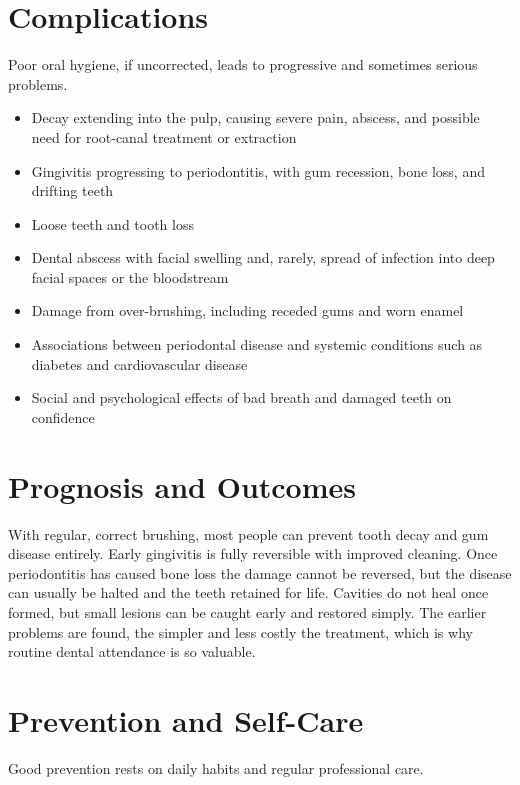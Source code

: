 \section*{Complications}
Poor oral hygiene, if uncorrected, leads to progressive and sometimes serious problems.

\begin{itemize}
    \item Decay extending into the pulp, causing severe pain, abscess, and possible need for root-canal treatment or extraction
    \item Gingivitis progressing to periodontitis, with gum recession, bone loss, and drifting teeth
    \item Loose teeth and tooth loss
    \item Dental abscess with facial swelling and, rarely, spread of infection into deep facial spaces or the bloodstream
    \item Damage from over-brushing, including receded gums and worn enamel
    \item Associations between periodontal disease and systemic conditions such as diabetes and cardiovascular disease
    \item Social and psychological effects of bad breath and damaged teeth on confidence
\end{itemize}

\section*{Prognosis and Outcomes}
With regular, correct brushing, most people can prevent tooth decay and gum disease entirely. Early gingivitis is fully reversible with improved cleaning. Once periodontitis has caused bone loss the damage cannot be reversed, but the disease can usually be halted and the teeth retained for life. Cavities do not heal once formed, but small lesions can be caught early and restored simply. The earlier problems are found, the simpler and less costly the treatment, which is why routine dental attendance is so valuable.

\section*{Prevention and Self-Care}
Good prevention rests on daily habits and regular professional care.

